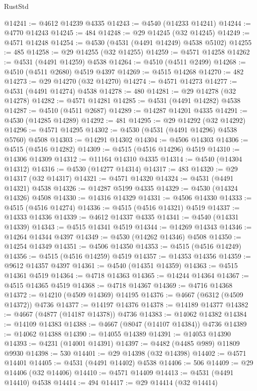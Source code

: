 \begin{lexlean}{RustStd}
\begin{coremodule}
@14241 := @4612 @14239 @4335
@14243 := @4540 (@14233 @14241)
@14244 := @4770 @14243
@14245 := 484
@14248 := @29 @14245 (@32 @14245)
@14249 := @4571 @14248
@14254 := @4530 (@4531 (@4491 @14249) @4538 @5102)
@14255 := 485
@14258 := @29 @14255 (@32 @14255)
@14259 := @4571 @14258
@14262 := @4531 (@4491 @14259) @4538
@14264 := @4510 (@4511 @2499)
@14268 := @4510 (@4511 @2680) @4519 @4397
@14269 := @4515 @14268
@14270 := 482
@14273 := @29 @14270 (@32 @14270)
@14274 := @4571 @14273
@14277 := @4531 (@4491 @14274) @4538
@14278 := 480
@14281 := @29 @14278 (@32 @14278)
@14282 := @4571 @14281
@14285 := @4531 (@4491 @14282) @4538
@14287 := @4510 (@4511 @2687)
@14289 := @14287 @14201 @4335
@14291 := @4530 (@14285 @14289)
@14292 := 481
@14295 := @29 @14292 (@32 @14292)
@14296 := @4571 @14295
@14302 := @4530 (@4531 (@4491 @14296) @4538 @5760) @4508
@14303 := @14291 @14302
@14304 := @4506 @14303
@14306 := @4515 (@4516 @14282)
@14309 := @4515 (@4516 @14296) @4519
@14310 := @14306 @14309
@14312 := @11164 @14310 @4335
@14314 := @4540 (@14304 @14312)
@14316 := @4530 (@14277 @14314)
@14317 := 483
@14320 := @29 @14317 (@32 @14317)
@14321 := @4571 @14320
@14324 := @4531 (@4491 @14321) @4538
@14326 := @14287 @5199 @4335
@14329 := @4530 (@14324 @14326) @4508
@14330 := @14316 @14329
@14331 := @4506 @14330
@14333 := @4515 (@4516 @14274)
@14336 := @4515 (@4516 @14321) @4519
@14337 := @14333 @14336
@14339 := @4612 @14337 @4335
@14341 := @4540 (@14331 @14339)
@14343 := @4515 @14341 @4519
@14344 := @14269 @14343
@14346 := @14264 @14344 @4397
@14349 := @4530 (@14262 @14346) @4508
@14350 := @14254 @14349
@14351 := @4506 @14350
@14353 := @4515 (@4516 @14249)
@14356 := @4515 (@4516 @14259) @4519
@14357 := @14353 @14356
@14359 := @9612 @14357 @4397
@14361 := @4540 (@14351 @14359)
@14363 := @4515 @14361 @4519
@14364 := @4718 @14363
@14365 := @14244 @14364
@14367 := @4515 @14365 @4519
@14368 := @4718 @14367
@14369 := @4716 @14368
@14372 := @14210 (@4509 @14369) @14195
@14376 := @4667 (@6312 (@4509 @14372)) @4736
@14377 := @14197 @14376
@14378 := @14189 @14377
@14382 := @4667 (@4877 (@14187 @14378)) @4736
@14383 := @14062 @14382
@14384 := @14109 @14383
@14388 := @4667 (@8047 (@14107 @14384)) @4736
@14389 := @14062 @14388
@14390 := @14055 @14389
@14391 := @14053 @14390
@14393 := @4231 (@14001 @14391)
@14397 := @4482 (@4485 @989) @11809 @9930
@14398 := 530
@14401 := @29 @14398 (@32 @14398)
@14402 := @4571 @14401
@14405 := @4531 (@4491 @14402) @4538
@14406 := 506
@14409 := @29 @14406 (@32 @14406)
@14410 := @4571 @14409
@14413 := @4531 (@4491 @14410) @4538
@14414 := 494
@14417 := @29 @14414 (@32 @14414)

\end{coremodule}
\end{lexlean}
